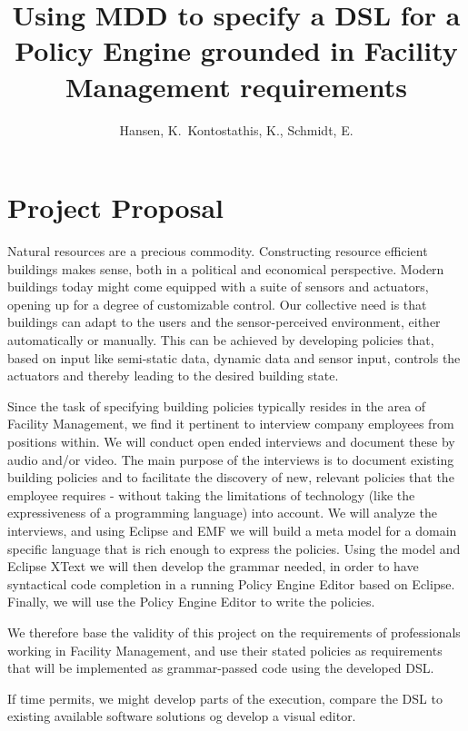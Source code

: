 \documentclass{llncs}
\begin{document}
\frontmatter
\pagestyle{headings}
\title{Using MDD to specify a DSL for a Policy Engine grounded in Facility Management requirements}
\author{Hansen, K.\, Kontostathis, K., Schmidt, E.}
\maketitle
\section{Project Proposal}
Natural resources are a precious commodity. Constructing resource efficient buildings makes sense, both in a political and economical perspective. Modern buildings today might come equipped with a suite of sensors and actuators, opening up for a degree of customizable control. Our collective need is that buildings can adapt to the users and the sensor-perceived environment, either automatically or manually. This can be achieved by developing policies that, based on input like semi-static data, dynamic data and sensor input, controls the actuators and thereby leading to the desired building state.

Since the task of specifying building policies typically resides in the area of Facility Management, we find it pertinent to interview company employees from positions within. We will conduct open ended interviews and document these by audio and/or video. The main purpose of the interviews is to document existing building policies and to facilitate the discovery of new, relevant policies that the employee requires - without taking the limitations of technology (like the expressiveness of a programming language) into account. We will analyze the interviews, and using Eclipse and EMF we will build a meta model for a domain specific language that is rich enough to express the policies. Using the model and Eclipse XText we will then develop the grammar needed, in order to have syntactical code completion in a running Policy Engine Editor based on Eclipse. Finally, we will use the Policy Engine Editor to write the policies.

We therefore base the validity of this project on the requirements of professionals working in Facility Management, and use their stated policies as requirements that will be implemented as grammar-passed code using the developed DSL.

If time permits, we might develop parts of the execution, compare the DSL to existing available software solutions og develop a visual editor.
\end{document}
